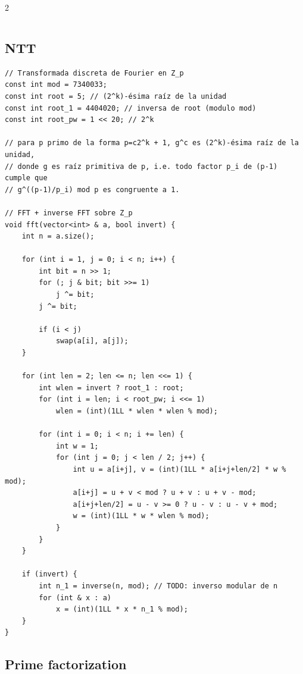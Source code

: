 \documentclass[twoside]{article}
\begin{document}
\begin{multicols*}{2}
\begin{verbatim}
\end{verbatim}

	{
		\subsection*{NTT}
	}
	\begin{verbatim}
// Transformada discreta de Fourier en Z_p
const int mod = 7340033;
const int root = 5; // (2^k)-ésima raíz de la unidad
const int root_1 = 4404020; // inversa de root (modulo mod)
const int root_pw = 1 << 20; // 2^k

// para p primo de la forma p=c2^k + 1, g^c es (2^k)-ésima raíz de la unidad,
// donde g es raíz primitiva de p, i.e. todo factor p_i de (p-1) cumple que
// g^((p-1)/p_i) mod p es congruente a 1.

// FFT + inverse FFT sobre Z_p
void fft(vector<int> & a, bool invert) {
    int n = a.size();

    for (int i = 1, j = 0; i < n; i++) {
        int bit = n >> 1;
        for (; j & bit; bit >>= 1)
            j ^= bit;
        j ^= bit;

        if (i < j)
            swap(a[i], a[j]);
    }

    for (int len = 2; len <= n; len <<= 1) {
        int wlen = invert ? root_1 : root;
        for (int i = len; i < root_pw; i <<= 1)
            wlen = (int)(1LL * wlen * wlen % mod);

        for (int i = 0; i < n; i += len) {
            int w = 1;
            for (int j = 0; j < len / 2; j++) {
                int u = a[i+j], v = (int)(1LL * a[i+j+len/2] * w % mod);
                a[i+j] = u + v < mod ? u + v : u + v - mod;
                a[i+j+len/2] = u - v >= 0 ? u - v : u - v + mod;
                w = (int)(1LL * w * wlen % mod);
            }
        }
    }

    if (invert) {
        int n_1 = inverse(n, mod); // TODO: inverso modular de n
        for (int & x : a)
            x = (int)(1LL * x * n_1 % mod);
    }
}

\end{verbatim}

	{
		\subsection*{Prime factorization}
	}
	\begin{verbatim}


\end{verbatim}
\end{multicols*}
\end{document}
